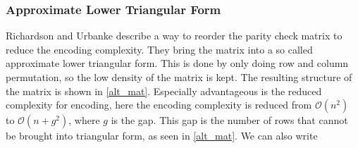 \subsubsection{Approximate Lower Triangular Form} \label{alt_enc_alg}
Richardson and Urbanke\cite{RiUr01} describe a way to reorder the parity check matrix to reduce the encoding complexity. They bring the matrix into a so called approximate lower triangular form. This is done by only doing row and column permutation, so the low density of the matrix is kept. The resulting structure of the matrix is shown in \cref{alt_mat}. Especially advantageous is the reduced complexity for encoding, here the encoding complexity is reduced from $\mathcal{O}(n^2)$ to $\mathcal{O}(n + g^2)$, where $g$ is the gap. This gap is the number of rows that cannot be brought into triangular form, as seen in \cref{alt_mat}. We can also write

